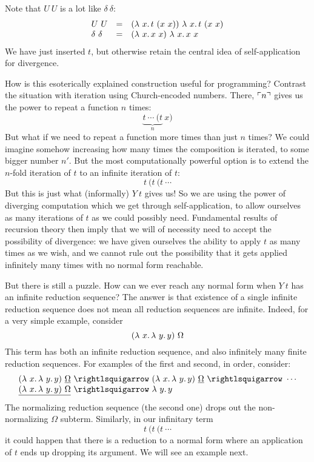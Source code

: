 Note that $U\ U$ is a lot like $\delta\ \delta$:
\[
\begin{array}{lll}
  U\ U & = & (\lambda\ x.\, t\ (x\ x))\ \lambda\ x.\, t\ (x\ x) \\
  \delta\ \delta & = & (\lambda\ x.\, x\ x)\ \lambda\ x.\, x\ x
\end{array}
\]
\noindent We have just inserted $t$, but otherwise retain the central idea of self-application
for divergence.

How is this esoterically explained construction useful for programming?  Contrast
the situation with iteration using Church-encoded numbers.  There, $\ulcorner n \urcorner$ gives us the
power to repeat a function $n$ times:
\[
\underbrace{t\ \cdots\ (t}_n\ x)
\]
\noindent But what if we need to repeat a function more times than
just $n$ times?  We could imagine somehow increasing how many times
the composition is iterated, to some bigger number $n'$.  But the most
computationally powerful option is to extend the $n$-fold iteration of
$t$ to an infinite iteration of $t$:
\[
t\ (t\ (t\ \cdots
\]
\noindent But this is just what (informally) $Y\ t$ gives us!  So we
are using the power of diverging computation which we get through
self-application, to allow ourselves as many iterations of $t$ as we
could possibly need.  Fundamental results of recursion theory then
imply that we will of necessity need to accept the possibility of
divergence: we have given ourselves the ability to apply $t$ as many
times as we wish, and we cannot rule out the possibility that it gets
applied infinitely many times with no normal form reachable.

But there is still a puzzle.  How can we ever reach any normal form when
$Y\ t$ has an infinite reduction sequence?  The answer is that existence
of a single infinite reduction sequence does not mean all reduction
sequences are infinite.  Indeed, for a very simple example, consider
\[
(\lambda\ x.\, \lambda\ y.\, y)\ \Omega
\]
\noindent This term has both an infinite reduction sequence, and also infinitely many finite reduction sequences.  For examples of the first and second, in order, consider:
\[
\begin{array}{l}
  (\lam{x}{\lam{y}{y}})\ \underline{\Omega}\ \betaa\ (\lam{x}{\lam{y}{y}})\ \underline{\Omega}\ \betaa \ \cdots \\
  \underline{(\lam{x}{\lam{y}{y}})\ \Omega} \ \betaa \ \lam{y}{y}
\end{array}
\]
\noindent The normalizing reduction sequence (the second one) drops out the non-normalizing $\Omega$ subterm.
Similarly, in our infinitary term
\[
t\ (t\ (t\ \cdots
\]
\noindent it could happen that there is a reduction to a normal form where an application of $t$ ends up dropping
its argument.  We will see an example next.

